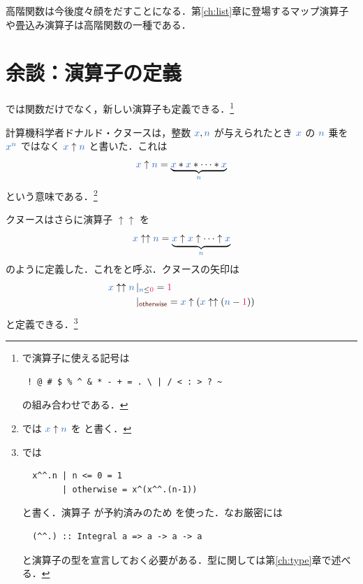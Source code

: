 \documentclass[a5paper,twoside,fleqn,draft]{jsbook}
\begin{document}
高階関数は今後度々顔をだすことになる．第\ref{ch:list}章に登場するマップ演算子や畳込み演算子は高階関数の一種である．

\section{余談：演算子の定義}

\haskell では関数だけでなく，新しい演算子も定義できる．\footnote{\haskell で演算子に使える記号は
\begin{verbatim}
 ! @ # $ % ^ & * - + = . \ | / < : > ? ~
\end{verbatim}%
の組み合わせである．}


計算機科学者ドナルド・クヌースは，整数 $\hVar{x},\hVar{n}$ が与えられたとき $\hVar{x}$ の $\hVar{n}$ 乗を ${\hVar{x}}^{\hVar{n}}$ ではなく $\hVar{x}\uparrow\hVar{n}$ と書いた．これは
\begin{equation}
  \hVar{x}\uparrow\hVar{n}
  =\underbrace{\hVar{x}*\hVar{x}*\dotsb*\hVar{x}}_{\hVar{n}}
\end{equation}
という意味である．\footnote{\haskell では $\hVar{x}\uparrow\hVar{n}$ を  と書く．}

クヌースはさらに演算子 $\uparrow\uparrow$ を
\begin{equation}
  \hVar{x}\uparrow\uparrow\hVar{n}
  =\underbrace{\hVar{x}\uparrow\hVar{x}\uparrow\dotsb\uparrow\hVar{x}}_{\hVar{n}}
\end{equation}
のように定義した．これをと呼ぶ．クヌースの矢印は
\begin{align}
  \hVar{x}\uparrow\uparrow\hVar{n}
  &\hGuard{\hVar{n}\le\hConstant{0}}=\hConstant{1}\\
  &\hGuard{\hOtherwise}
  =\hVar{x}\uparrow(\hVar{x}\uparrow\uparrow(\hVar{n}-\hConstant{1}))
\end{align}
と定義できる．\footnote{\haskell では
\begin{verbatim}
  x^^.n | n <= 0 = 1 
        | otherwise = x^(x^^.(n-1))
\end{verbatim}
と書く．演算子 \code{\textasciicircum\textasciicircum} が予約済みのため  を使った．なお厳密には
\begin{verbatim}
  (^^.) :: Integral a => a -> a -> a
\end{verbatim}
と演算子の型を宣言しておく必要がある．型に関しては第\ref{ch:type}章で述べる．}
\end{document}
